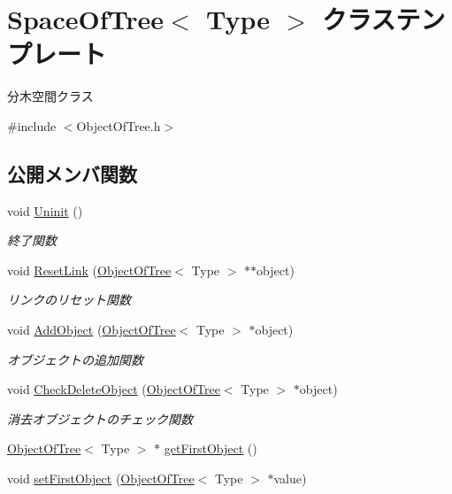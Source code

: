 \hypertarget{class_space_of_tree}{}\section{Space\+Of\+Tree$<$ Type $>$ クラステンプレート}
\label{class_space_of_tree}


分木空間クラス  




{\ttfamily \#include $<$Object\+Of\+Tree.\+h$>$}

\subsection*{公開メンバ関数}
\begin{DoxyCompactItemize}
\item 
void \mbox{\hyperlink{class_space_of_tree_a8f7238becd1df9192e5f5ddc442b7ee3}{Uninit}} ()
\begin{DoxyCompactList}\small\item\em 終了関数 \end{DoxyCompactList}\item 
void \mbox{\hyperlink{class_space_of_tree_a3231408434cb3066768cfd9d33d86190}{Reset\+Link}} (\mbox{\hyperlink{class_object_of_tree}{Object\+Of\+Tree}}$<$ Type $>$ $\ast$$\ast$object)
\begin{DoxyCompactList}\small\item\em リンクのリセット関数 \end{DoxyCompactList}\item 
void \mbox{\hyperlink{class_space_of_tree_a8156722056d7b2ab354ff22235772d7e}{Add\+Object}} (\mbox{\hyperlink{class_object_of_tree}{Object\+Of\+Tree}}$<$ Type $>$ $\ast$object)
\begin{DoxyCompactList}\small\item\em オブジェクトの追加関数 \end{DoxyCompactList}\item 
void \mbox{\hyperlink{class_space_of_tree_a746aef6b3bafdde17daa5125cc9bc43c}{Check\+Delete\+Object}} (\mbox{\hyperlink{class_object_of_tree}{Object\+Of\+Tree}}$<$ Type $>$ $\ast$object)
\begin{DoxyCompactList}\small\item\em 消去オブジェクトのチェック関数 \end{DoxyCompactList}\item 
\mbox{\hyperlink{class_object_of_tree}{Object\+Of\+Tree}}$<$ Type $>$ $\ast$ \mbox{\hyperlink{class_space_of_tree_a97ee8bf10b8d88d49e61875c88608b15}{get\+First\+Object}} ()
\item 
void \mbox{\hyperlink{class_space_of_tree_a43844bf7bfbf0d021b9ae4708cb2e6f4}{set\+First\+Object}} (\mbox{\hyperlink{class_object_of_tree}{Object\+Of\+Tree}}$<$ Type $>$ $\ast$value)
\end{DoxyCompactItemize}


